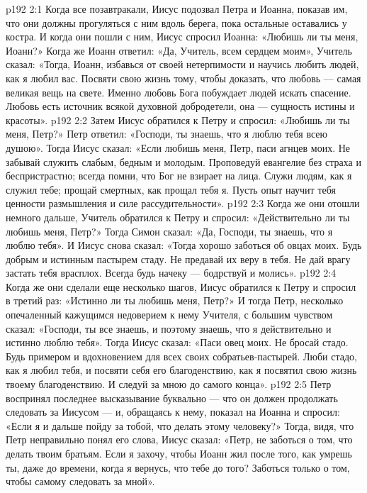 \vs p192 2:1 Когда все позавтракали, Иисус подозвал Петра и Иоанна, показав им, что они должны прогуляться с ним вдоль берега, пока остальные оставались у костра. И когда они пошли с ним, Иисус спросил Иоанна: «Любишь ли ты меня, Иоанн?» Когда же Иоанн ответил: «Да, Учитель, всем сердцем моим», Учитель сказал: «Тогда, Иоанн, избавься от своей нетерпимости и научись любить людей, как я любил вас. Посвяти свою жизнь тому, чтобы доказать, что любовь --- самая великая вещь на свете. Именно любовь Бога побуждает людей искать спасение. Любовь есть источник всякой духовной добродетели, она --- сущность истины и красоты».
\vs p192 2:2 Затем Иисус обратился к Петру и спросил: «Любишь ли ты меня, Петр?» Петр ответил: «Господи, ты знаешь, что я люблю тебя всею душою». Тогда Иисус сказал: «Если любишь меня, Петр, паси агнцев моих. Не забывай служить слабым, бедным и молодым. Проповедуй евангелие без страха и беспристрастно; всегда помни, что Бог не взирает на лица. Служи людям, как я служил тебе; прощай смертных, как прощал тебя я. Пусть опыт научит тебя ценности размышления и силе рассудительности».
\vs p192 2:3 Когда же они отошли немного дальше, Учитель обратился к Петру и спросил: «Действительно ли ты любишь меня, Петр?» Тогда Симон сказал: «Да, Господи, ты знаешь, что я люблю тебя». И Иисус снова сказал: «Тогда хорошо заботься об овцах моих. Будь добрым и истинным пастырем стаду. Не предавай их веру в тебя. Не дай врагу застать тебя врасплох. Всегда будь начеку --- бодрствуй и молись».
\vs p192 2:4 Когда же они сделали еще несколько шагов, Иисус обратился к Петру и спросил в третий раз: «Истинно ли ты любишь меня, Петр?» И тогда Петр, несколько опечаленный кажущимся недоверием к нему Учителя, с большим чувством сказал: «Господи, ты все знаешь, и поэтому знаешь, что я действительно и истинно люблю тебя». Тогда Иисус сказал: «Паси овец моих. Не бросай стадо. Будь примером и вдохновением для всех своих собратьев\hyp{}пастырей. Люби стадо, как я любил тебя, и посвяти себя его благоденствию, как я посвятил свою жизнь твоему благоденствию. И следуй за мною до самого конца».
\vs p192 2:5 Петр воспринял последнее высказывание буквально --- что он должен продолжать следовать за Иисусом --- и, обращаясь к нему, показал на Иоанна и спросил: «Если я и дальше пойду за тобой, что делать этому человеку?» Тогда, видя, что Петр неправильно понял его слова, Иисус сказал: «Петр, не заботься о том, что делать твоим братьям. Если я захочу, чтобы Иоанн жил после того, как умрешь ты, даже до времени, когда я вернусь, что тебе до того? Заботься только о том, чтобы самому следовать за мной».
